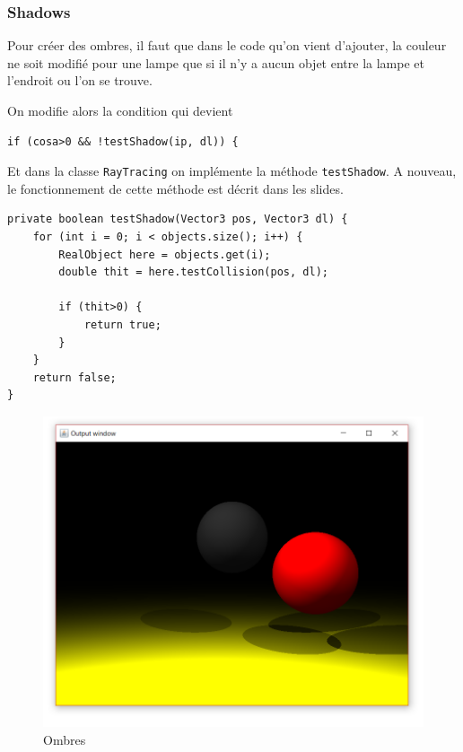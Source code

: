 \subsubsection{Shadows}

Pour créer des ombres, il faut que dans le code qu'on vient d'ajouter, la couleur ne soit modifié pour une lampe que si il n'y a aucun objet entre la lampe et l'endroit ou l'on se trouve.

On modifie alors la condition qui devient 

\begin{lstlisting}
if (cosa>0 && !testShadow(ip, dl)) {
\end{lstlisting}

Et dans la classe \texttt{RayTracing} on implémente la méthode \texttt{testShadow}. A nouveau, le fonctionnement de cette méthode est décrit dans les slides.

\begin{lstlisting}
private boolean testShadow(Vector3 pos, Vector3 dl) {
    for (int i = 0; i < objects.size(); i++) {
        RealObject here = objects.get(i);
        double thit = here.testCollision(pos, dl);
        
        if (thit>0) {
            return true;
        }
    }
    return false;
}
\end{lstlisting}

\begin{figure}[H]
	\caption{\label{10_2} Ombres}
	\centering
	\includegraphics[scale = 0.4]{10_2.png}
\end{figure}


